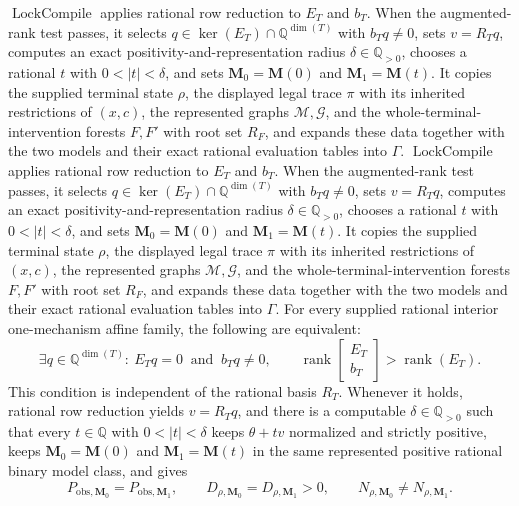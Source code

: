 \(\operatorname{LockCompile}\) applies rational row reduction to \(E_T\) and \(b_T\).  When the augmented-rank test passes, it selects \(q\in\ker(E_T)\cap\mathbb Q^{\dim(T)}\) with \(b_Tq\neq0\), sets \(v=R_Tq\), computes an exact positivity-and-representation radius \(\delta\in\mathbb Q_{>0}\), chooses a rational \(t\) with \(0<|t|<\delta\), and sets \(\mathbf M_0=\mathbf M(0)\) and \(\mathbf M_1=\mathbf M(t)\).  It copies the supplied terminal state \(\rho\), the displayed legal trace \(\pi\) with its inherited restrictions of \((x,c)\), the represented graphs \(\mathcal M,\mathcal G\), and the whole-terminal-intervention forests \(F,F'\) with root set \(R_F\), and expands these data together with the two models and their exact rational evaluation tables into \(\Gamma\).
\(\operatorname{LockCompile}\) applies rational row reduction to \(E_T\) and \(b_T\).  When the augmented-rank test passes, it selects \(q\in\ker(E_T)\cap\mathbb Q^{\dim(T)}\) with \(b_Tq\neq0\), sets \(v=R_Tq\), computes an exact positivity-and-representation radius \(\delta\in\mathbb Q_{>0}\), chooses a rational \(t\) with \(0<|t|<\delta\), and sets \(\mathbf M_0=\mathbf M(0)\) and \(\mathbf M_1=\mathbf M(t)\).  It copies the supplied terminal state \(\rho\), the displayed legal trace \(\pi\) with its inherited restrictions of \((x,c)\), the represented graphs \(\mathcal M,\mathcal G\), and the whole-terminal-intervention forests \(F,F'\) with root set \(R_F\), and expands these data together with the two models and their exact rational evaluation tables into \(\Gamma\).
For every supplied rational interior one-mechanism affine family, the following are equivalent:
\[
 \exists q\in\mathbb Q^{\dim(T)}:\ E_Tq=0\ \text{ and }\ b_Tq\neq0,
 \qquad
 \operatorname{rank}\!\begin{bmatrix}E_T\\ b_T\end{bmatrix}>
 \operatorname{rank}(E_T).
\]
This condition is independent of the rational basis \(R_T\).  Whenever it holds, rational row reduction yields \(v=R_Tq\), and there is a computable \(\delta\in\mathbb Q_{>0}\) such that every \(t\in\mathbb Q\) with \(0<|t|<\delta\) keeps \(\theta+t v\) normalized and strictly positive, keeps \(\mathbf M_0=\mathbf M(0)\) and \(\mathbf M_1=\mathbf M(t)\) in the same represented positive rational binary model class, and gives
\[
 P_{\mathrm{obs},\mathbf M_0}=P_{\mathrm{obs},\mathbf M_1},\qquad
 D_{\rho,\mathbf M_0}=D_{\rho,\mathbf M_1}>0,
 \qquad N_{\rho,\mathbf M_0}\neq N_{\rho,\mathbf M_1}.
\]
